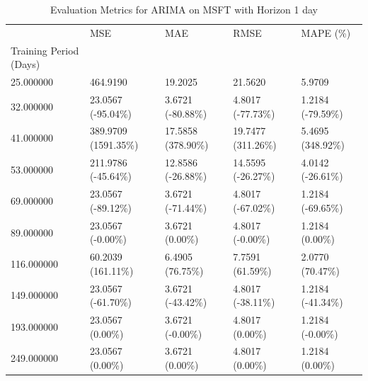 \begin{table}
\caption{Evaluation Metrics for ARIMA on MSFT with Horizon 1 day}
\label{tab:arima_MSFT_h1_metrics}
\begin{tabular}{lllll}
\toprule
 & MSE & MAE & RMSE & MAPE (\%) \\
Training Period (Days) &  &  &  &  \\
\midrule
25.000000 & 464.9190 & 19.2025 & 21.5620 & 5.9709 \\
32.000000 & 23.0567 (-95.04\%) & 3.6721 (-80.88\%) & 4.8017 (-77.73\%) & 1.2184 (-79.59\%) \\
41.000000 & 389.9709 (1591.35\%) & 17.5858 (378.90\%) & 19.7477 (311.26\%) & 5.4695 (348.92\%) \\
53.000000 & 211.9786 (-45.64\%) & 12.8586 (-26.88\%) & 14.5595 (-26.27\%) & 4.0142 (-26.61\%) \\
69.000000 & 23.0567 (-89.12\%) & 3.6721 (-71.44\%) & 4.8017 (-67.02\%) & 1.2184 (-69.65\%) \\
89.000000 & 23.0567 (-0.00\%) & 3.6721 (0.00\%) & 4.8017 (-0.00\%) & 1.2184 (0.00\%) \\
116.000000 & 60.2039 (161.11\%) & 6.4905 (76.75\%) & 7.7591 (61.59\%) & 2.0770 (70.47\%) \\
149.000000 & 23.0567 (-61.70\%) & 3.6721 (-43.42\%) & 4.8017 (-38.11\%) & 1.2184 (-41.34\%) \\
193.000000 & 23.0567 (0.00\%) & 3.6721 (-0.00\%) & 4.8017 (0.00\%) & 1.2184 (-0.00\%) \\
249.000000 & 23.0567 (0.00\%) & 3.6721 (0.00\%) & 4.8017 (0.00\%) & 1.2184 (0.00\%) \\
\bottomrule
\end{tabular}
\end{table}
